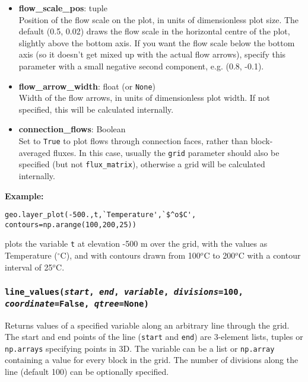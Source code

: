 \begin{itemize}
\item \textbf{flow\_scale\_pos}: tuple\\
  Position of the flow scale on the plot, in units of dimensionless plot size.  The default (0.5, 0.02) draws the flow scale in the horizontal centre of the plot, slightly above the bottom axis.  If you want the flow scale below the bottom axis (so it doesn't get mixed up with the actual flow arrows), specify this parameter with a small negative second component, e.g. (0.8, -0.1).
\item \textbf{flow\_arrow\_width}: float (or \texttt{None})\\
  Width of the flow arrows, in units of dimensionless plot width.  If not specified, this will be calculated internally.
\item \textbf{connection\_flows}: Boolean\\
  Set to \texttt{True} to plot flows through connection faces, rather than block-averaged fluxes.  In this case, usually the \texttt{grid} parameter should also be specified (but not \texttt{flux\_matrix}), otherwise a grid will be calculated internally.
\end{itemize}

\textbf{Example:}

\begin{verbatim}
geo.layer_plot(-500.,t,`Temperature',`$^o$C', contours=np.arange(100,200,25))
\end{verbatim}

plots the variable \texttt{t} at elevation -500 m over the grid, with the values as Temperature ($^{\circ}$C), and with contours drawn from 100$^o$C to 200$^o$C with a contour interval of 25$^o$C.

\subsubsection{\texttt{line\_values(\emph{start}, \emph{end}, \emph{variable}, \emph{divisions}=100, \emph{coordinate}=\texttt{False}, \emph{qtree}=None)}}
\label{sec:line_values}

Returns values of a specified variable along an arbitrary line through the grid.  The start and end points of the line (\texttt{start} and \texttt{end}) are 3-element lists, tuples or \texttt{np.arrays} specifying points in 3D.  The variable can be a list or \texttt{np.array} containing a value for every block in the grid.  The number of divisions along the line (default 100) can be optionally specified.

